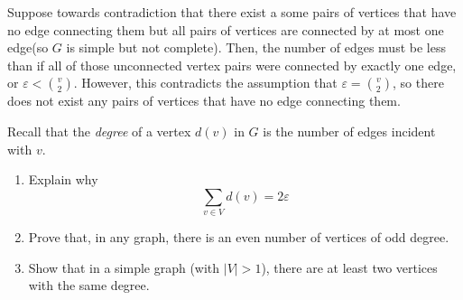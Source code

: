 \documentclass[12pt]{extarticle}
\begin{document}
\begin{sol}
\begin{enumerate}[label=(\alph*)]
\begin{enumerate}[label=\arabic*.]
			            Suppose towards contradiction that there exist a some pairs of vertices that have no edge connecting them but all pairs of vertices are connected by at most one edge(so $G$ is simple but not complete).
			            Then, the number of edges must be less than if all of those unconnected vertex pairs were connected by exactly one edge, or $\varepsilon < \binom{v}{2}$.
			            However, this contradicts the assumption that $\varepsilon = \binom{v}{2}$, so there does not exist any pairs of vertices that have no edge connecting them.
		      \end{enumerate}
	\end{enumerate}
\end{sol}

\begin{prob} \label{prob:problem_2}
	Recall that the \textit{degree} of a vertex $d(v)$ in $G$ is the number of edges incident with $v$.
	\begin{enumerate}[label=(\alph*)]
		\item Explain why \begin{equation}
			      \sum_{v\in V}d(v) = 2\varepsilon
		      \end{equation}
		\item Prove that, in any graph, there is an even number of vertices of odd degree.
		\item Show that in a simple graph (with $|V| > 1$), there are at least two vertices with the same degree.
	\end{enumerate}
\end{prob}
\end{document}
